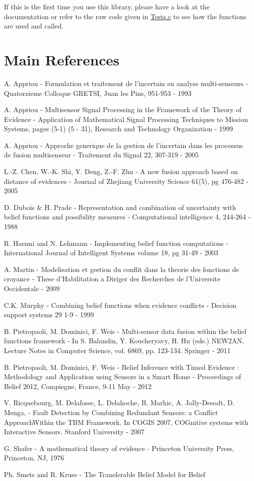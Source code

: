 If this is the first time you use this library, please have a look at the documentation or refer to the raw code given in \hyperlink{_tests_8c}{Tests.c} to see how the functions are used and called.\hypertarget{index_ref_sec}{}\section{Main References}\label{index_ref_sec}
\begin{DoxyItemize}
\item A. Appriou -\/ Formulation et traitement de l'incertain en analyse multi-\/senseurs -\/ Quatorzieme Colloque GRETSI, Juan les Pins, 951-\/953 -\/ 1993 \item A. Appriou -\/ Multisensor Signal Processing in the Framework of the Theory of Evidence -\/ Application of Mathematical Signal Processing Techniques to Mission Systems, pages (5-\/1) (5 -\/ 31), Research and Technology Organization -\/ 1999 \item A. Appriou -\/ Approche generique de la gestion de l'incertain dans les processus de fusion multisenseur -\/ Traitement du Signal 22, 307-\/319 -\/ 2005 \item L.-\/Z. Chen, W.-\/K. Shi, Y. Deng, Z.-\/F. Zhu -\/ A new fusion approach based on distance of evidences -\/ Journal of Zhejiang University Science 61(5), pg 476-\/482 -\/ 2005 \item D. Dubois \& H. Prade -\/ Representation and combination of uncertainty with belief functions and possibility measures -\/ Computational intelligence 4, 244-\/264 -\/ 1988 \item R. Haenni and N. Lehmann -\/ Implementing belief function computations -\/ International Journal of Intelligent Systems volume 18, pg 31-\/49 -\/ 2003 \item A. Martin -\/ Modelisation et gestion du conflit dans la theorie des fonctions de croyance -\/ These d'Habilitation a Diriger des Recherches de l'Universite Occidentale -\/ 2009 \item C.K. Murphy -\/ Combining belief functions when evidence conflicts -\/ Decision support systems 29 1-\/9 -\/ 1999 \item B. Pietropaoli, M. Dominici, F. Weis -\/ Multi-\/sensor data fusion within the belief functions framework -\/ In S. Balandin, Y. Koucheryavy, H. Hu (eds.) NEW2AN, Lecture Notes in Computer Science, vol. 6869, pp. 123-\/134. Springer -\/ 2011 \item B. Pietropaoli, M. Dominici, F. Weis -\/ Belief Inference with Timed Evidence : Methodology and Application using Sensors in a Smart Home -\/ Proceedings of Belief 2012, Compiegne, France, 9-\/11 May -\/ 2012 \item V. Ricquebourg, M. Delafosse, L. Delahoche, B. Marhic, A. Jolly-\/Desodt, D. Menga, -\/ Fault Detection by Combining Redundant Sensors: a Conflict ApproachWithin the TBM Framework. In COGIS 2007, COGnitive systems with Interactive Sensors. Stanford University -\/ 2007 \item G. Shafer -\/ A mathematical theory of evidence -\/ Princeton University Press, Princeton, NJ, 1976 \item Ph. Smets and R. Kruse -\/ The Transferable Belief Model for Belief 
\end{DoxyItemize}
